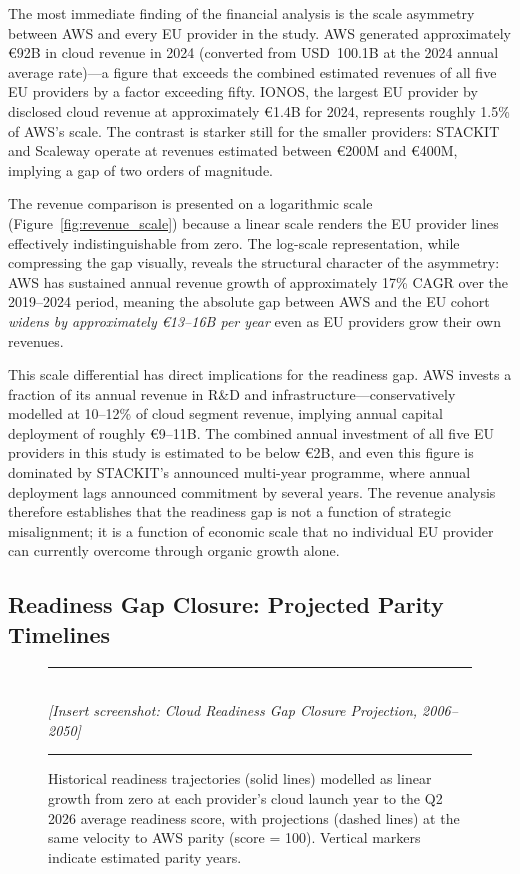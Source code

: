 The most immediate finding of the financial analysis is the scale asymmetry between AWS and every EU provider in the study. AWS generated approximately €92B in cloud revenue in 2024 (converted from USD~100.1B at the 2024 annual average rate)---a figure that exceeds the combined estimated revenues of all five EU providers by a factor exceeding fifty. IONOS, the largest EU provider by disclosed cloud revenue at approximately €1.4B for 2024, represents roughly 1.5\% of AWS's scale. The contrast is starker still for the smaller providers: STACKIT and Scaleway operate at revenues estimated between €200M and €400M, implying a gap of two orders of magnitude.

The revenue comparison is presented on a logarithmic scale (Figure~\ref{fig:revenue_scale}) because a linear scale renders the EU provider lines effectively indistinguishable from zero. The log-scale representation, while compressing the gap visually, reveals the structural character of the asymmetry: AWS has sustained annual revenue growth of approximately 17\% CAGR over the 2019--2024 period, meaning the absolute gap between AWS and the EU cohort \emph{widens by approximately €13--16B per year} even as EU providers grow their own revenues.

This scale differential has direct implications for the readiness gap. AWS invests a fraction of its annual revenue in R\&D and infrastructure---conservatively modelled at 10--12\% of cloud segment revenue, implying annual capital deployment of roughly €9--11B. The combined annual investment of all five EU providers in this study is estimated to be below €2B, and even this figure is dominated by STACKIT's announced multi-year programme, where annual deployment lags announced commitment by several years. The revenue analysis therefore establishes that the readiness gap is not a function of strategic misalignment; it is a function of economic scale that no individual EU provider can currently overcome through organic growth alone.

\subsection{Readiness Gap Closure: Projected Parity Timelines}
\label{subsec:gap_closure}

\begin{figure}[htbp]
  \centering
  \vspace{0.4cm}
  \noindent\rule{\linewidth}{0.4pt}\\[0.3cm]
  {\small\itshape [Insert screenshot: Cloud Readiness Gap Closure Projection, 2006--2050]}\\[0.3cm]
  \noindent\rule{\linewidth}{0.4pt}
  \vspace{0.2cm}
  \caption{Historical readiness trajectories (solid lines) modelled as linear growth from zero at each provider's cloud launch year to the Q2 2026 average readiness score, with projections (dashed lines) at the same velocity to AWS parity (score = 100). Vertical markers indicate estimated parity years.}
  \label{fig:gap_closure}
\end{figure}

